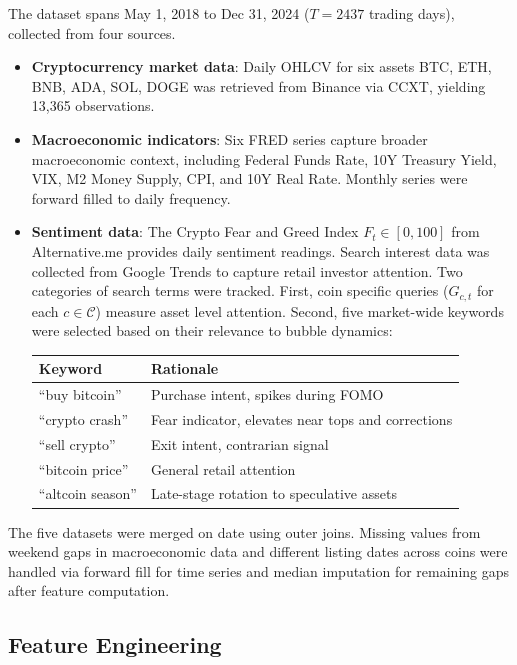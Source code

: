 \documentclass[12pt,a4paper]{article}
\begin{document}
The dataset spans May 1, 2018 to Dec 31, 2024 ($T = 2437$ trading days), collected from four sources. 
\begin{itemize}
    \item \textbf{Cryptocurrency market data}: Daily OHLCV for six assets BTC, ETH, BNB, ADA, SOL, DOGE was retrieved from Binance via CCXT, yielding 13,365 observations. 
      \item \textbf{Macroeconomic indicators}: Six FRED series capture broader macroeconomic context, including Federal Funds Rate, 10Y Treasury Yield, VIX, M2 Money Supply, CPI, and 10Y Real Rate. Monthly series were forward filled to daily frequency. 
    \item \textbf{Sentiment data}: The Crypto Fear and Greed Index $F_t \in [0,100]$ from Alternative.me provides daily sentiment readings. Search interest data was collected from Google Trends to capture retail investor attention. Two categories of search terms were tracked. First, coin specific queries ($G_{c,t}$ for each $c \in \mathcal{C}$) measure asset level attention. Second, five market-wide keywords were selected based on their relevance to bubble dynamics:

\begin{table}[h]
\centering
\small
\begin{tabular}{ll}
\toprule
Keyword & Rationale \\
\midrule
``buy bitcoin'' & Purchase intent, spikes during FOMO \\
``crypto crash'' & Fear indicator, elevates near tops and corrections \\
``sell crypto'' & Exit intent, contrarian signal \\
``bitcoin price'' & General retail attention \\
``altcoin season'' & Late-stage rotation to speculative assets \\
\bottomrule
\end{tabular}
\end{table}
 
\end{itemize}
The five datasets were merged on date using outer joins. Missing values from weekend gaps in macroeconomic data and different listing dates across coins were handled via forward fill for time series and median imputation for remaining gaps after feature computation.

\subsection{Feature Engineering}
 
\end{document}
